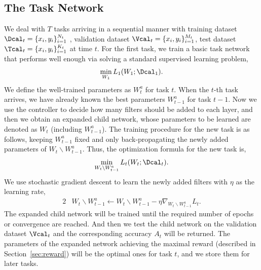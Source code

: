 \documentclass{article}
\begin{document}
\subsection{The Task Network}
We deal with  $T$ tasks arriving in a sequential manner  with training dataset $\Dcal_t=\{x_i,y_i\}_{i=1}^{N_t}$ , validation dataset $\Vcal_t=\{x_i,y_i\}_{i=1}^{M_t}$, test dataset $\Tcal_t = \{x_i,y_i\}_{i=1}^{K_t}$ at time $t$.  
For the first task, we train a basic task network that performs well enough via solving a standard supervised learning problem,
\begin{alignat}{2}
\label{init}   %
\min_{W_1} L_1(W_1;\Dcal_1).
\end{alignat}
We define the well-trained parameters as $W_t^a$ for task $t$.  
When the $t$-th task arrives, we have already known the best parameters $W_{t-1}^a$ for task $t-1$. Now we use the controller to decide how many filters should be added to each layer, and then we obtain an expanded child network, whose parameters to be learned are denoted as $W_t$ (including $W_{t-1}^a$). The training procedure for the new task is as follows, keeping $W_{t-1}^a$ fixed and only back-propagating the newly added parameters of $W_t \backslash W_{t-1}^a$. Thus, the optimization formula for the new task is,
\begin{alignat}{2}
\label{latter}   %
\min_{W_t \backslash W_{t-1}^a} L_t(W_t;\Dcal_t).
\end{alignat}
We use stochastic gradient descent to learn the newly added filters with $\eta$ as the learning rate,
\begin{alignat}{2}
\label{update}
& W_t \backslash W_{t-1}^a \longleftarrow W_t \backslash W_{t-1}^a - \eta \nabla_{W_t \backslash W_{t-1}^a} L_t.
\end{alignat}
The expanded child network will be trained until  the required number of epochs or convergence are reached. And then we test the child network on the validation dataset $\Vcal_t$ and the corresponding accuracy $A_t$ will be returned. 
The parameters of the expanded network achieving the maximal reward (described in Section~\ref{sec:reward}) will be the optimal ones for task $t$, and we store them for later tasks.
\end{document}
